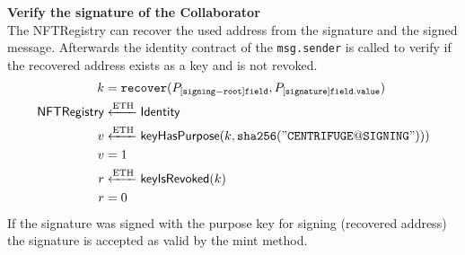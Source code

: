 \textbf{Verify the signature of the Collaborator} \\
The NFTRegistry can recover the used address from the signature and the signed message. Afterwards the identity contract of the \texttt{msg.sender} is called to verify if the recovered address exists as a key and is not revoked.
\begin{equation}
\begin{split}
k & = \mathtt{recover}(P_{[\mathtt{signing-root}]\mathtt{field}}, P_{[\mathtt{signature}]\mathtt{field.value}}) \\
\mathsf{NFTRegistry} &\xleftarrow[]{\text{ETH}}  \mathsf{Identity} \\
v &\xleftarrow[]{\text{ETH}} \textsf{keyHasPurpose}(k ,\mathtt{sha256("CENTRIFUGE@SIGNING"))} )\\
v & = 1 \\
r &\xleftarrow[]{\text{ETH}} \textsf{keyIsRevoked}(k)\\
r & = 0
\end{split}
\end{equation}
If the signature was signed with the purpose key for signing (recovered address) the signature is accepted as valid by the mint method.
